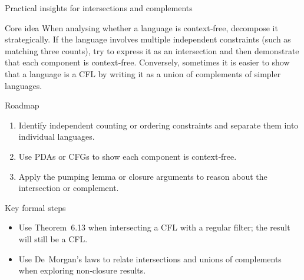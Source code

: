 \begin{frame}[t]{Practical insights for intersections and complements}
  \begin{tblock}{Core idea}
    When analysing whether a language is context‑free, decompose it
    strategically.  If the language involves multiple independent
    constraints (such as matching three counts), try to express it as an
    intersection and then demonstrate that each component is context‑free.
    Conversely, sometimes it is easier to show that a language is a CFL
    by writing it as a union of complements of simpler languages.
  \end{tblock}
  \begin{tblock}{Roadmap}
    \begin{enumerate}
      \item Identify independent counting or ordering constraints and
        separate them into individual languages.
      \item Use PDAs or CFGs to show each component is context‑free.
      \item Apply the pumping lemma or closure arguments to reason about
        the intersection or complement.
    \end{enumerate}
  \end{tblock}
  \begin{tblock}{Key formal steps}
    \begin{itemize}
      \item Use Theorem 6.13 when intersecting a CFL with a regular
        filter; the result will still be a CFL.
      \item Use De Morgan’s laws to relate intersections and unions of
        complements when exploring non‑closure results.
    \end{itemize}
  \end{tblock}
  \label{fr:6.2-19}
\end{frame}

